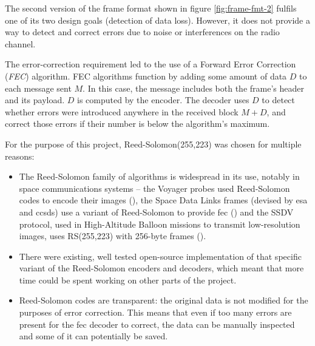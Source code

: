 The second version of the frame format shown in figure \ref{fig:frame-fmt-2}
fulfils one of its two design goals (detection of data loss). However, it does
not provide a way to detect and correct errors due to noise or interferences on
the radio channel.

The error-correction requirement led to the use of a Forward Error Correction
(\textit{FEC}) algorithm. FEC algorithms function by adding some amount of data
\(D\) to each message sent \(M\). In this case, the message includes both the
frame's header and its payload. \(D\) is computed by the encoder. The decoder
uses \(D\) to detect whether errors were introduced anywhere in the received
block \(M+D\), and correct those errors if their number is below the
algorithm's maximum.


For the purpose of this project, Reed-Solomon(255,223) was chosen for multiple
reasons:

\begin{itemize}
    
\item The Reed-Solomon family of algorithms is widespread in its use, notably
in space communications systems – the Voyager probes used Reed-Solomon codes to
encode their images (\cite{Wicker1994}), the Space Data Links frames (devised
by \acrshort{esa} and \acrshort{ccsds}) use a variant of Reed-Solomon to
provide \acrshort{fec} (\cite{EuropeanCooperationforSpaceStandardization2010})
and the SSDV protocol, used in High-Altitude Balloon missions to transmit
low-resolution images, uses RS(255,223) with 256-byte frames (\cite{UKHAS2016}).

\item There were existing, well tested open-source implementation of that
specific variant of the Reed-Solomon encoders and decoders, which meant that
more time could be spent working on other parts of the project.


\item Reed-Solomon codes are transparent: the original data is not modified for
the purposes of error correction. This means that even if too many errors are
present for the \acrshort{fec} decoder to correct, the data can be manually
inspected and some of it can potentially be saved.
    
\end{itemize}

